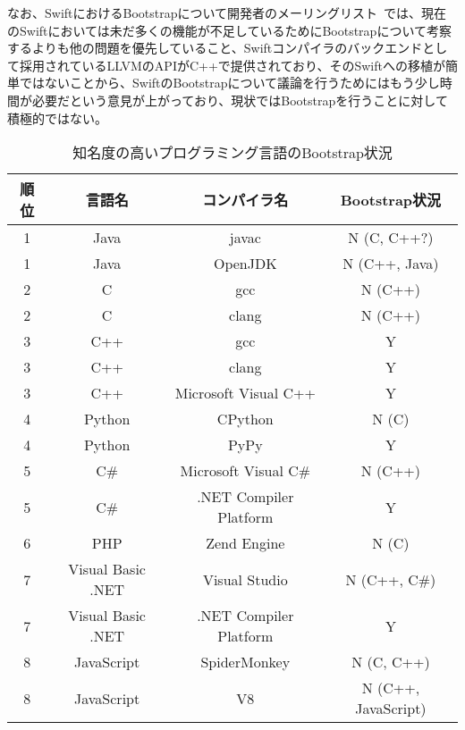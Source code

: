 なお、SwiftにおけるBootstrapについて開発者のメーリングリスト~\cite{dev-ml}では、現在のSwiftにおいては未だ多くの機能が不足しているためにBootstrapについて考察するよりも他の問題を優先していること、Swiftコンパイラのバックエンドとして採用されているLLVMのAPIがC++で提供されており、そのSwiftへの移植が簡単ではないことから、SwiftのBootstrapについて議論を行うためにはもう少し時間が必要だという意見が上がっており、現状ではBootstrapを行うことに対して積極的ではない。

\begin{table}[hb]
    \begin{center}
        \caption{知名度の高いプログラミング言語のBootstrap状況}
        \begin{tabular}{|c|c|c|c|}
            \hline
            順位 & 言語名 & コンパイラ名 & Bootstrap状況 \\
            \hline
            1 & Java & javac & N (C, C++?) \\
            \hline
            1 & Java & OpenJDK & N (C++, Java) \\
            \hline
            2 & C & gcc & N (C++) \\
            \hline
            2 & C & clang & N (C++) \\
            \hline
            3 & C++ & gcc & Y \\
            \hline
            3 & C++ & clang & Y \\
            \hline
            3 & C++ & Microsoft Visual C++ & Y \\
            \hline
            4 & Python & CPython & N (C) \\
            \hline
            4 & Python & PyPy & Y \\
            \hline
            5 & C\# & Microsoft Visual C\# & N (C++) \\
            \hline
            5 & C\# & .NET Compiler Platform & Y \\
            \hline
            6 & PHP & Zend Engine & N (C) \\
            \hline
            7 & Visual Basic .NET & Visual Studio & N (C++, C\#) \\
            \hline
            7 & Visual Basic .NET & .NET Compiler Platform & Y \\
            \hline
            8 & JavaScript & SpiderMonkey & N (C, C++) \\
            \hline
            8 & JavaScript & V8 & N (C++, JavaScript) \\
            \hline

\end{tabular}
\end{center}
\end{table}
